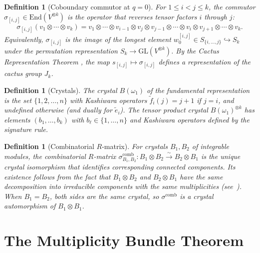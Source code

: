 \documentclass[11pt]{article}
\newtheorem{definition}[theorem]{Definition}
\theoremstyle{remark}
\newcommand{\GL}{\mathrm{GL}}
\newcommand{\End}{\mathrm{End}}
\begin{document}
\begin{definition}[Coboundary commutor at $q=0$]\label{def:commutor}
For $1 \leq i < j \leq k$, the \emph{commutor} $\sigma_{[i,j]} \in
\End(V^{\otimes k})$ is the operator that reverses tensor factors $i$
through $j$:
\[
  \sigma_{[i,j]}(v_1 \otimes \cdots \otimes v_k)
  = v_1 \otimes \cdots \otimes v_{i-1} \otimes v_j \otimes v_{j-1}
  \otimes \cdots \otimes v_i \otimes v_{j+1} \otimes \cdots \otimes v_k.
\]
Equivalently, $\sigma_{[i,j]}$ is the image of the longest element
$w_0^{[i,j]} \in S_{\{i,\ldots,j\}} \hookrightarrow S_k$ under the
permutation representation $S_k \to \GL(V^{\otimes k})$.
By the Cactus Representation Theorem \cite{clio-cactus}, the map
$s_{[i,j]} \mapsto \sigma_{[i,j]}$ defines a representation of the
cactus group $J_k$.
\end{definition}

\begin{definition}[Crystals]\label{def:crystal}
The crystal $B(\omega_1)$ of the fundamental representation is the
set $\{1, 2, \ldots, n\}$ with Kashiwara operators $\tilde{f}_i(j) = j+1$
if $j = i$, and undefined otherwise (and dually for $\tilde{e}_i$).
The tensor product crystal $B(\omega_1)^{\otimes k}$ has elements
$(b_1, \ldots, b_k)$ with $b_\ell \in \{1, \ldots, n\}$ and Kashiwara
operators defined by the \emph{signature rule}.
\end{definition}

\begin{definition}[Combinatorial $R$-matrix]\label{def:comb-R}
For crystals $B_1, B_2$ of integrable modules, the
\emph{combinatorial $R$-matrix}
$\sigma^{\mathrm{comb}}_{B_1, B_2}\colon B_1 \otimes B_2 \xrightarrow{\sim}
B_2 \otimes B_1$ is the unique crystal isomorphism that identifies
corresponding connected components. Its existence follows from the
fact that $B_1 \otimes B_2$ and $B_2 \otimes B_1$ have the same
decomposition into irreducible components with the same multiplicities
(see~\cite{kashiwara-crystal}).
When $B_1 = B_2$, both sides are the same crystal, so
$\sigma^{\mathrm{comb}}$ is a crystal automorphism of $B_1 \otimes B_1$.
\end{definition}

\section{The Multiplicity Bundle Theorem}
\end{document}
